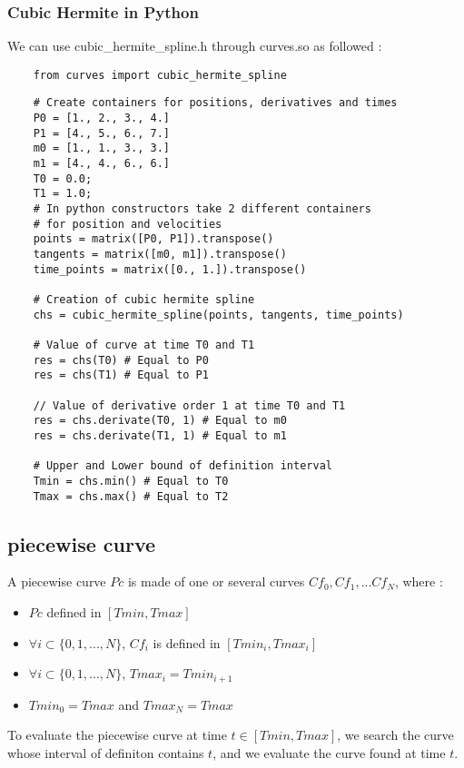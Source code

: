 \documentclass{article}
\begin{document}
    \subsubsection{Cubic Hermite in Python}

    We can use cubic\_hermite\_spline.h through curves.so as followed :

    \begin{lstlisting}
    from curves import cubic_hermite_spline
    \end{lstlisting}
    \begin{lstlisting}
    # Create containers for positions, derivatives and times
    P0 = [1., 2., 3., 4.]
    P1 = [4., 5., 6., 7.]
    m0 = [1., 1., 3., 3.]
    m1 = [4., 4., 6., 6.]
    T0 = 0.0;
    T1 = 1.0;
    # In python constructors take 2 different containers
    # for position and velocities
    points = matrix([P0, P1]).transpose()
    tangents = matrix([m0, m1]).transpose()
    time_points = matrix([0., 1.]).transpose()

    # Creation of cubic hermite spline
    chs = cubic_hermite_spline(points, tangents, time_points)

    # Value of curve at time T0 and T1
    res = chs(T0) # Equal to P0
    res = chs(T1) # Equal to P1

    // Value of derivative order 1 at time T0 and T1
    res = chs.derivate(T0, 1) # Equal to m0
    res = chs.derivate(T1, 1) # Equal to m1

    # Upper and Lower bound of definition interval
    Tmin = chs.min() # Equal to T0
    Tmax = chs.max() # Equal to T2
    \end{lstlisting}

\subsection{piecewise curve}

    A piecewise curve $Pc$ is made of one or several curves $Cf_0, Cf_1,...Cf_N$, where :
    \begin{itemize}
        \item $Pc$ defined in $[Tmin, Tmax]$
        \item $\forall i \subset \{0,1,...,N\}$, $Cf_i$ is defined in $[Tmin_i, Tmax_i]$
        \item $\forall i \subset \{0,1,...,N\}$, $Tmax_i = Tmin_{i+1}$
        \item $Tmin_0=Tmax$ and $Tmax_N=Tmax$
    \end{itemize}
    To evaluate the piecewise curve at time $t \in [Tmin, Tmax]$, we search the curve whose interval of definiton contains $t$, and we evaluate the curve found at time $t$.
\end{document}
